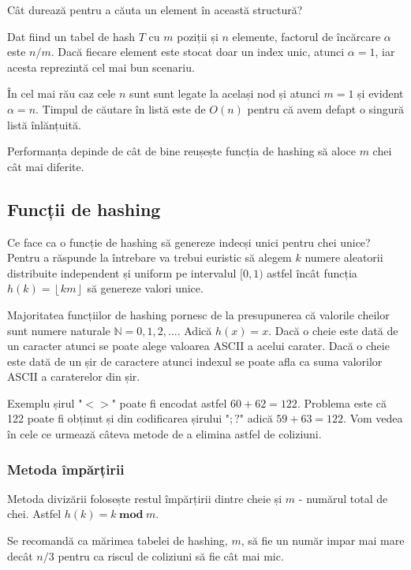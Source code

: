 Cât durează pentru a căuta un element în această structură?

Dat fiind un tabel de hash $T$ cu $m$ poziții și $n$ elemente, factorul de încărcare $\alpha$ este $n/m$. Dacă fiecare element este stocat doar un index unic, atunci $\alpha=1$, iar acesta reprezintă cel mai bun scenariu.

În cel mai rău caz cele $n$ sunt sunt legate la același nod și atunci $m=1$ și evident  $\alpha=n$. Timpul de căutare în listă este de $O(n)$ pentru că avem defapt o singură listă înlănțuită.

Performanța depinde de cât de bine reușește funcția de hashing să aloce $m$ chei cât mai diferite.

\subsection{Funcții de hashing}

Ce face ca o funcție de hashing să genereze indecși unici pentru chei unice? Pentru a răspunde la întrebare va trebui euristic să alegem $k$ numere aleatorii distribuite independent și uniform pe intervalul $[0,1)$ astfel încât funcția $h(k)=\left \lfloor km \right \rfloor$ să genereze valori unice.

Majoritatea funcțiilor de hashing pornesc de la presupunerea că valorile cheilor sunt numere naturale $\mathbb{N}={0,1,2,...}$. Adică $h(x)=x$. Dacă o cheie este dată de un caracter atunci se poate alege valoarea ASCII a acelui carater. Dacă o cheie este dată de un șir de caractere atunci indexul se poate afla ca suma valorilor ASCII a caraterelor din șir.

Exemplu șirul "$<>$" poate fi encodat astfel $60+62=122$. Problema este că 122 poate fi obținut și din codificarea șirului "$;?$" adică $59+63=122$. Vom vedea în cele ce urmează câteva metode de a elimina astfel de coliziuni.

\subsubsection{Metoda împărțirii}

Metoda divizării folosește restul împărțirii dintre cheie și $m$ - numărul total de chei. Astfel $h(k)=k \hspace{3pt} \textbf{mod} \hspace{3pt} m$.

Se recomandă ca mărimea tabelei de hashing, $m$, să fie un număr impar mai mare decât $n/3$ pentru ca riscul de coliziuni să fie cât mai mic.


